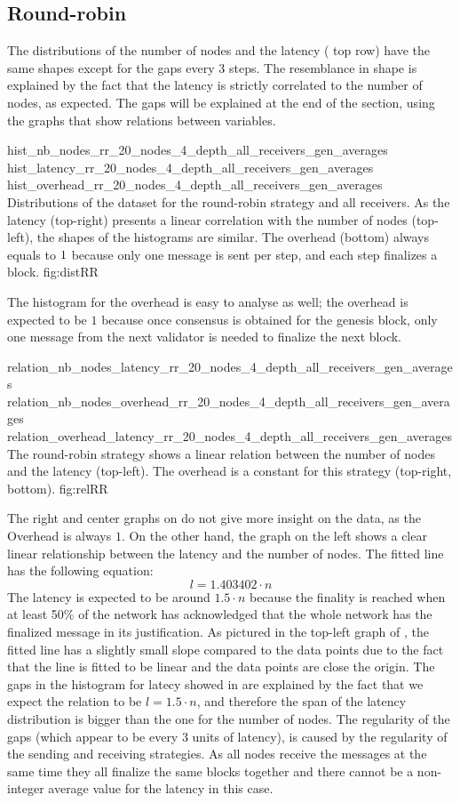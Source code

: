 \subsection{Round-robin}
\FloatBarrier
The distributions of the number of nodes and the latency
( top row) have the same
shapes except for the gaps every 3 steps. The resemblance in shape is explained
by the fact that the latency is strictly correlated to the number of nodes, as
expected.
The gaps will be explained at the end of the section, using the graphs that show
relations between variables.

\triplefigure
    {hist_nb_nodes_rr_20_nodes_4_depth_all_receivers_gen_averages}
    {hist_latency_rr_20_nodes_4_depth_all_receivers_gen_averages}
    {hist_overhead_rr_20_nodes_4_depth_all_receivers_gen_averages}
    {Distributions of the dataset for the round-robin strategy and all
    receivers. As the latency (top-right) presents a linear correlation with the number of
    nodes (top-left), the shapes of the histograms are similar. The overhead
    (bottom) always equals to $\protect 1$ because only one message is sent per step, and each step
    finalizes a block.}
    {fig:distRR}

The histogram for the overhead is easy to analyse as well; the overhead is
expected to be $1$ because once consensus is obtained for the genesis block, only
one message from the next validator is needed to finalize the next block.

\triplefigure
    {relation_nb_nodes_latency_rr_20_nodes_4_depth_all_receivers_gen_averages}
    {relation_nb_nodes_overhead_rr_20_nodes_4_depth_all_receivers_gen_averages}
    {relation_overhead_latency_rr_20_nodes_4_depth_all_receivers_gen_averages}
    {The round-robin strategy shows a linear relation between the number of
    nodes and the latency (top-left). The overhead is a constant for this
    strategy (top-right, bottom).}
    {fig:relRR}

The right and center graphs on  do not give more insight on the
data, as the Overhead is always \(1\). On the other hand, the graph on the left
shows a clear linear relationship between the latency and the number of nodes.
The fitted line has the following equation:
\[l = 1.403402\cdot n\]
The latency is expected to be around \(1.5\cdot n\) because the finality is
reached when at least 50\% of the network has acknowledged that the whole
network has the finalized message in its justification. As pictured in the
top-left graph of , the fitted line has a slightly small
slope compared to the data points due to the fact that the line is fitted to be
linear and the data points are close the origin. 
The gaps in the histogram for latecy showed in  are explained by the fact
that we expect the relation to be \(l = 1.5\cdot n\), and therefore the span of
the latency distribution is bigger than the one for the number of nodes. The
regularity of the gaps (which appear to be every 3 units of latency), is caused
by the regularity of the sending and receiving strategies. As all nodes receive
the messages at the same time they all finalize the same blocks together and
there cannot be a non-integer average value for the latency in this case.

